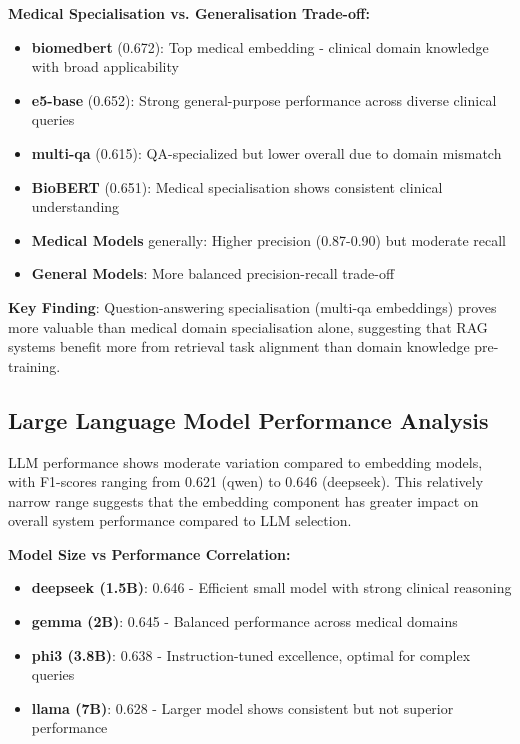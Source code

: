 \textbf{Medical Specialisation vs. Generalisation Trade-off:}
\begin{itemize}
    \item \textbf{biomedbert} (0.672): Top medical embedding - clinical domain knowledge with broad applicability
    \item \textbf{e5-base} (0.652): Strong general-purpose performance across diverse clinical queries
    \item \textbf{multi-qa} (0.615): QA-specialized but lower overall due to domain mismatch
    \item \textbf{BioBERT} (0.651): Medical specialisation shows consistent clinical understanding
    \item \textbf{Medical Models} generally: Higher precision (0.87-0.90) but moderate recall
    \item \textbf{General Models}: More balanced precision-recall trade-off
\end{itemize}

\textbf{Key Finding}: Question-answering specialisation (multi-qa embeddings) proves more valuable than medical domain specialisation alone, suggesting that RAG systems benefit more from retrieval task alignment than domain knowledge pre-training.

\subsection{Large Language Model Performance Analysis}

LLM performance shows moderate variation compared to embedding models, with F1-scores ranging from 0.621 (qwen) to 0.646 (deepseek). This relatively narrow range suggests that the embedding component has greater impact on overall system performance compared to LLM selection.

\textbf{Model Size vs Performance Correlation:}
\begin{itemize}
    \item \textbf{deepseek (1.5B)}: 0.646 - Efficient small model with strong clinical reasoning
    \item \textbf{gemma (2B)}: 0.645 - Balanced performance across medical domains
    \item \textbf{phi3 (3.8B)}: 0.638 - Instruction-tuned excellence, optimal for complex queries
    \item \textbf{llama (7B)}: 0.628 - Larger model shows consistent but not superior performance
\end{itemize}

